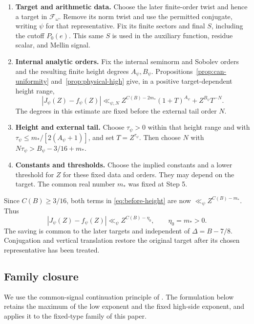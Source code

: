 \documentclass[11pt,a4paper]{article}
\numberwithin{equation}{section}
\theoremstyle{definition}
\theoremstyle{remark}
\newcommand{\cF}{\mathcal F}
\begin{document}
\begin{enumerate}[label=\textup{\arabic*.},leftmargin=*,itemsep=5pt]
\item \textbf{Target and arithmetic data.}
Choose the later finite-order twist and hence a target in $\cF_\omega$.
Remove its norm twist and use the permitted conjugate, writing $\psi$
for that representative. Fix its finite sectors and final $S$, including
the cutoff $P_0(e)$. This same $S$ is used in the auxiliary function,
residue scalar, and Mellin signal.

\item \textbf{Internal analytic orders.}
Fix the internal seminorm and Sobolev orders and the resulting finite
height degrees $A_\psi,B_\psi$. Propositions~\ref{prop:can-uniformity}
and~\ref{prop:physical-high} give, in a positive target-dependent
height range,
\begin{equation}\label{eq:before-height}
 |J_\psi(Z)-f_\psi(Z)|
 \ll_{\psi,N}Z^{C(B)-2m_*}(1+T)^{A_\psi}
                       +Z^{B_\psi}T^{-N}.
\end{equation}
The degrees in this estimate are fixed before the external tail
order $N$.

\item \textbf{Height and external tail.}
Choose $\tau_\psi>0$ within that height range and with
$\tau_\psi\le m_*/[2(A_\psi+1)]$, and set $T=Z^{\tau_\psi}$.
Then choose $N$ with
$N\tau_\psi>B_\psi-3/16+m_*$.

\item \textbf{Constants and thresholds.}
Choose the implied constants and a lower threshold for $Z$ for these
fixed data and orders. They may depend on the target. The common
real number $m_*$ was fixed at Step 5.
\end{enumerate}

Since $C(B)\ge3/16$, both terms in \eqref{eq:before-height} are now
$\ll_\psi Z^{C(B)-m_*}$. Thus
\begin{equation}\label{eq:fixed-high}
 |J_\psi(Z)-f_\psi(Z)|\ll_\psi Z^{C(B)-\eta_0},
 \qquad \eta_0=m_*>0.
\end{equation}
The saving is common to the later targets and independent of
$\Delta=B-7/8$. Conjugation and vertical translation restore the
original target after its chosen representative has been treated.

\subsection{Family closure}

We use the common-signal continuation principle of
\cite[Proposition~2.1]{Q}.  The formulation below retains the maximum
of the low exponent and the fixed high-side exponent, and applies it to
the fixed-type family of this paper.
\end{document}
